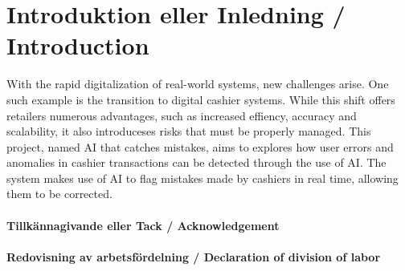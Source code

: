 \documentclass[a4paper,12pt]{article}
\begin{document}
\tableofcontents


\cleardoublepage


\newpage

\mainmatter


\section{Introduktion eller Inledning / Introduction}
\label{sec:introduktion}
With the rapid digitalization of real-world systems, new challenges arise. One such example is the transition to digital cashier systems. While this shift offers retailers numerous advantages, such as increased effiency, accuracy and scalability, it also introduceses risks that must be properly managed. This project, named AI that catches mistakes, aims to explores how user errors and anomalies in cashier transactions can be detected through the use of AI. The system makes use of AI to flag mistakes made by cashiers in real time, allowing them to be corrected.

\paragraph{Tillkännagivande eller Tack / Acknowledgement}

\paragraph{Redovisning av arbetsfördelning / Declaration of division of labor}
\end{document}
